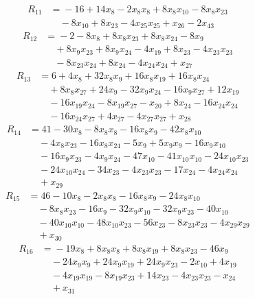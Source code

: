 \begin{align*}
R_{11}&={}-16 +14x_{8} -2x_{8}x_{8} +8x_{8}x_{10} -8x_{8}x_{23}\\
&\quad{}-8x_{10} +8x_{23} -4x_{25}x_{25} +x_{26} -2x_{43}
\end{align*}
\begin{align*}
R_{12}&={}-2 -8x_{8} +8x_{8}x_{23} +8x_{8}x_{24} -8x_{9}\\
&\quad{}+8x_{9}x_{23} +8x_{9}x_{24} -4x_{19} +8x_{23} -4x_{23}x_{23}\\
&\quad{}-8x_{23}x_{24} +8x_{24} -4x_{24}x_{24} +x_{27}
\end{align*}
\begin{align*}
R_{13}&={}6 +4x_{8} +32x_{8}x_{9} +16x_{8}x_{19} +16x_{8}x_{24}\\
&\quad{}+8x_{8}x_{27} +24x_{9} -32x_{9}x_{24} -16x_{9}x_{27} +12x_{19}\\
&\quad{}-16x_{19}x_{24} -8x_{19}x_{27} -x_{20} +8x_{24} -16x_{24}x_{24}\\
&\quad{}-16x_{24}x_{27} +4x_{27} -4x_{27}x_{27} +x_{28}
\end{align*}
\begin{align*}
R_{14}&={}41 -30x_{8} -8x_{8}x_{8} -16x_{8}x_{9} -42x_{8}x_{10}\\
&\quad{}-4x_{8}x_{23} -16x_{8}x_{24} -5x_{9} +5x_{9}x_{9} -16x_{9}x_{10}\\
&\quad{}-16x_{9}x_{23} -4x_{9}x_{24} -47x_{10} -41x_{10}x_{10} -24x_{10}x_{23}\\
&\quad{}-24x_{10}x_{24} -34x_{23} -4x_{23}x_{23} -17x_{24} -4x_{24}x_{24}\\
&\quad{}+x_{29}
\end{align*}
\begin{align*}
R_{15}&={}46 -10x_{8} -2x_{8}x_{8} -16x_{8}x_{9} -24x_{8}x_{10}\\
&\quad{}-8x_{8}x_{23} -16x_{9} -32x_{9}x_{10} -32x_{9}x_{23} -40x_{10}\\
&\quad{}-40x_{10}x_{10} -48x_{10}x_{23} -56x_{23} -8x_{23}x_{23} -4x_{29}x_{29}\\
&\quad{}+x_{30}
\end{align*}
\begin{align*}
R_{16}&={}-19x_{8} +8x_{8}x_{8} +8x_{8}x_{19} +8x_{8}x_{23} -46x_{9}\\
&\quad{}-24x_{9}x_{9} +24x_{9}x_{19} +24x_{9}x_{23} -2x_{10} +4x_{19}\\
&\quad{}-4x_{19}x_{19} -8x_{19}x_{23} +14x_{23} -4x_{23}x_{23} -x_{24}\\
&\quad{}+x_{31}
\end{align*}
